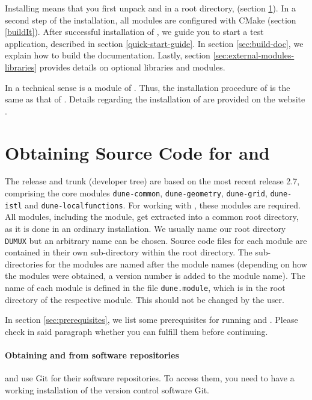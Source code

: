 Installing \Dumux means that you first unpack \Dune and \Dumux in a root directory,
(section \ref{sc:ObtainingSourceCode}).
In a second step of the installation, all modules are configured with CMake
(section \ref{buildIt}).
After successful installation of \Dumux, we guide you to start a test application,
described in section \ref{quick-start-guide}.
In section \ref{sec:build-doc}, we explain how to build the \Dumux documentation.
Lastly, section \ref{sec:external-modules-libraries} provides details on optional libraries and modules.

In a technical sense \Dumux is a module of \Dune.
Thus, the installation procedure of \Dumux is the same as that of \Dune.
Details regarding the installation of \Dune are provided on the \Dune website \cite{DUNE-HP}.


\section{Obtaining Source Code for \Dune and \Dumux}
\label{sc:ObtainingSourceCode}
The \Dumux release and trunk (developer tree) are based on the most recent
\Dune release 2.7, comprising the core modules \texttt{dune-common}, \texttt{dune-geometry},
\texttt{dune-grid}, \texttt{dune-istl} and \texttt{dune-localfunctions}.
For working with \Dumux, these modules are required.
All \Dune modules, including the \Dumux module, get extracted into a common root directory, as it
is done in an ordinary \Dune installation.
We usually name our root directory \texttt{DUMUX} but an arbitrary name can be chosen.
Source code files for each \Dune module are contained in their own sub-directory within the root directory.
The sub-directories for the modules are named after the module names (depending on how
the modules were obtained, a version number is added to the module name).
The name of each \Dune module is defined in the file \texttt{dune.module}, which is
in the root directory of the respective module. This should not be changed by the user.

In section \ref{sec:prerequisites}, we list some prerequisites for running \Dune and \Dumux.
Please check in said paragraph whether you can fulfill them before continuing.

\paragraph{Obtaining \Dune and \Dumux from software repositories}
\Dune and \Dumux use Git for their software repositories. To access them,
you need to have a working installation of the version control software Git.

